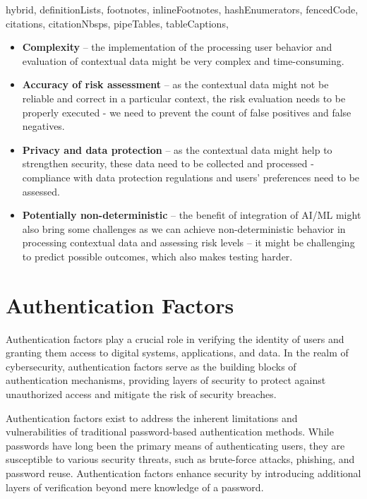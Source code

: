 \documentclass[
  digital,     %
  oneside,     %
  nosansbold,  %
  nocolorbold, %
  lof,         %
  lot,         %
]{fithesis4}
\begin{document}
\begin{markdown*}{%
  hybrid,
  definitionLists,
  footnotes,
  inlineFootnotes,
  hashEnumerators,
  fencedCode,
  citations,
  citationNbsps,
  pipeTables,
  tableCaptions,
}
\begin{itemize}
    \item \textbf{Complexity} -- the implementation of the processing user behavior and evaluation of contextual data might be very complex and time-consuming.  
    \item \textbf{Accuracy of risk assessment} -- as the contextual data might not be reliable and correct in a particular context, the risk evaluation needs to be properly executed - we need to prevent the count of false positives and false negatives. 
    \item \textbf{Privacy and data protection} -- as the contextual data might help to strengthen security, these data need to be collected and processed - compliance with data protection regulations and users' preferences need to be assessed.
    \item \textbf{Potentially non-deterministic} -- the benefit of integration of AI/ML might also bring some challenges as we can achieve non-deterministic behavior in processing contextual data and assessing risk levels -- it might be challenging to predict possible outcomes, which also makes testing harder.\cite{intro-logintc}\cite{intro-silverfort}\cite{intro-descope}
    
\end{itemize}

\newpage
\section{Authentication Factors}
Authentication factors play a crucial role in verifying the identity of users and granting them access to digital systems, applications, and data.
In the realm of cybersecurity, authentication factors serve as the building blocks of authentication mechanisms, providing layers of security to protect against unauthorized access and mitigate the risk of security breaches.

Authentication factors exist to address the inherent limitations and vulnerabilities of traditional password-based authentication methods.
While passwords have long been the primary means of authenticating users, they are susceptible to various security threats, such as brute-force attacks, phishing, and password reuse.
Authentication factors enhance security by introducing additional layers of verification beyond mere knowledge of a password.\cite{auth-factors-aratek}



\end{markdown*}
\end{document}
